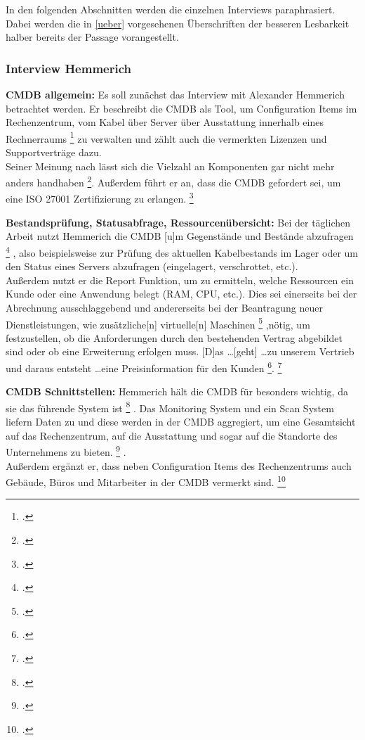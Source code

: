 In den folgenden Abschnitten werden die einzelnen Interviews paraphrasiert. Dabei werden die in \autoref{ueber} vorgesehenen Überschriften der besseren Lesbarkeit halber bereits der Passage vorangestellt.

\subsubsection{Interview Hemmerich}
\textbf{\acs{CMDB} allgemein: }Es soll zunächst das Interview mit Alexander Hemmerich betrachtet werden. Er beschreibt die \acs{CMDB} als Tool, um \glqq{}Configuration Items im Rechenzentrum, vom Kabel über Server über Ausstattung innerhalb eines Rechnerraums\grqq
\footcite[][o. \pno]{Hemm_2019}
zu verwalten und zählt auch die vermerkten Lizenzen und Supportverträge dazu.\\
Seiner Meinung nach lässt sich die Vielzahl an Komponenten \glqq{}gar nicht mehr anders handhaben\grqq
\footcite[][o. \pno]{Hemm_2019}.
Außerdem führt er an, dass die \acs{CMDB} gefordert sei, um eine ISO 27001 Zertifizierung zu erlangen.
\footcite[Vgl.][o. \pno]{Hemm_2019}

\textbf{Bestandsprüfung, Statusabfrage, Ressourcenübersicht: }Bei der täglichen Arbeit nutzt Hemmerich die \acs{CMDB} \glqq{}[u]m Gegenstände und Bestände abzufragen\grqq
\footcite[][o. \pno]{Hemm_2019}
, also beispielsweise zur Prüfung des aktuellen Kabelbestands im Lager oder um den Status eines Servers abzufragen (eingelagert, verschrottet, etc.).\\
Außerdem nutzt er die Report Funktion, um zu ermitteln, welche Ressourcen ein Kunde oder eine Anwendung belegt (RAM, CPU, etc.). Dies sei einerseits bei der Abrechnung ausschlaggebend und andererseits bei der Beantragung neuer Dienstleistungen, wie \glqq{}zusätzliche[n] virtuelle[n] Maschinen\grqq
\footcite[][o. \pno]{Hemm_2019}
,nötig, um festzustellen, ob die Anforderungen durch den bestehenden Vertrag abgebildet sind oder ob eine Erweiterung erfolgen muss. \glqq{}[D]as \ldots [geht] \ldots zu unserem Vertrieb und daraus entsteht \ldots eine Preisinformation für den Kunden\grqq
\footcite[][o. \pno]{Hemm_2019}.{}
\footcite[Vgl.][o. \pno]{Hemm_2019}

\textbf{\acs{CMDB} Schnittstellen: }Hemmerich hält die \acs{CMDB} für besonders wichtig, da sie \glqq{}das führende System ist\grqq
\footcite[][o. \pno]{Hemm_2019}
. Das Monitoring System und ein Scan System liefern Daten zu und diese werden in der CMDB \glqq{}aggregiert, um eine Gesamtsicht auf das Rechenzentrum, auf die Ausstattung und sogar auf die Standorte des Unternehmens zu bieten.\grqq
\footcite[][o. \pno]{Hemm_2019}
.\\
Außerdem ergänzt er, dass neben Configuration Items des Rechenzentrums auch Gebäude, Büros und Mitarbeiter in der \acs{CMDB} vermerkt sind.
\footcite[Vgl.][o. \pno]{Hemm_2019}

